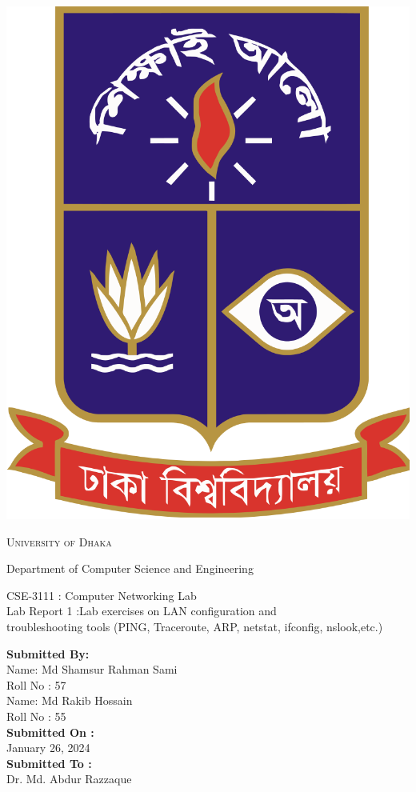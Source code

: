 \documentclass[11pt]{article}
\begin{document}
\begin{titlepage}
	\begin{center}
    	\includegraphics[scale=0.10]{du.png}\par
		\begin{Huge}
			\textsc{University of Dhaka}\par
		\end{Huge}
		\begin{Large}
			Department of Computer Science and Engineering\par \vspace{1cm}
			CSE-3111 : Computer Networking Lab \\[12pt]	
			Lab Report 1 :Lab exercises on LAN configuration and \\[5pt]  troubleshooting tools (PING, Traceroute, ARP, netstat, ifconfig, nslook,etc.)
		\end{Large}
	\end{center}  	
	\begin{large}
		\textbf{Submitted By:\\[12pt]}
			Name: Md Shamsur Rahman Sami\\[8pt]
			Roll No : 57\\[12pt]
			Name: Md Rakib Hossain\\[8pt]
			Roll No : 55\\[12pt]
		\textbf{Submitted On : \\[12pt]}
			January 26, 2024\\[20pt]
		\textbf{Submitted To :\\[12pt]}
			Dr. Md. Abdur Razzaque\\[12pt]
             
	\end{large}
\end{titlepage}
\end{document}
